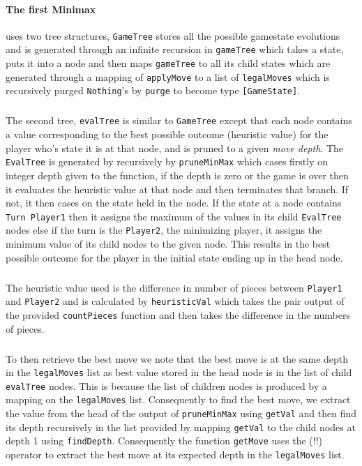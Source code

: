 \documentclass[11pt]{article}
\begin{document}
\paragraph{The first Minimax} uses two tree structures, \verb|GameTree| stores all the possible gamestate evolutions and is generated through an infinite recursion in \verb|gameTree| which takes a state, puts it into a node and then maps \verb|gameTree| to all its child states which are generated through a mapping of \verb|applyMove| to a list of \verb|legalMoves| which is recursively purged \verb|Nothing|'s by \verb|purge| to become type \verb|[GameState]|.

\subparagraph*{}The second tree, \verb|evalTree| is similar to \verb|GameTree| except that each node contains a value corresponding to the best possible outcome (heuristic value) for the player who's state it is at that node, and is pruned to a given \textit{move depth}. The \verb|EvalTree| is generated by recursively by \verb|pruneMinMax| which cases firstly on integer depth given to the function, if the depth is zero or the game is over then it evaluates the heuristic value at that node and then terminates that branch. If not, it then cases on the state held in the node. If the state at a node contains \verb|Turn Player1| then it assigns the maximum of the values in its child \verb|EvalTree| nodes else if the turn is the \verb|Player2|, the minimizing player, it assigns the minimum value of its child nodes to the given node. This results in the best possible outcome for the player in the initial state ending up in the head node.

\subparagraph*{}The heuristic value used is the difference in number of pieces between \verb|Player1| and \verb|Player2| and is calculated by \verb|heuristicVal| which takes the pair output of the provided \verb|countPieces| function and then takes the difference in the numbers of pieces.

\subparagraph*{}To then retrieve the best move we note that the best move is at the same depth in the \verb|legalMoves| list as best value stored in the head node is in the list of child \verb|evalTree| nodes. This is because the list of children nodes is produced by a mapping on the \verb|legalMoves| list. Consequently to find the best move, we extract the value from the head of the output of \verb|pruneMinMax| using \verb|getVal| and then find its depth recursively in the list provided by mapping \verb|getVal| to the child nodes at depth 1 using \verb|findDepth|. Consequently the function \verb|getMove| uses the (!!) operator to extract the best move at its expected depth in the \verb|legalMoves| list.
\end{document}
